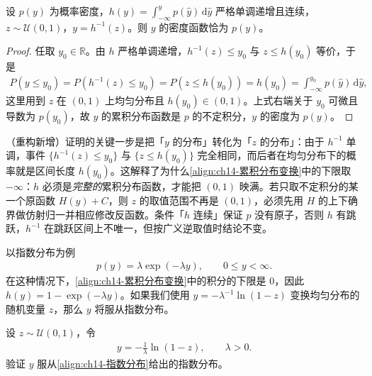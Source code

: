 \documentclass[../../main.tex]{subfiles}
\begin{document}
\begin{proposition}[逆变换采样的正确性]\label{proposition:ch14-逆变换正确性}
设 $p(y)$ 为概率密度，$h(y)=\int_{-\infty}^{y}p(\hat{y})\,\mathrm{d}\hat{y}$ 严格单调递增且连续，$z\sim\mathcal{U}(0,1)$，$y=h^{-1}(z)$。则 $y$ 的密度函数恰为 $p(y)$。
\end{proposition}

\begin{proof}
任取 $y_0\in\mathbb{R}$。由 $h$ 严格单调递增，$h^{-1}(z)\leqslant y_0$ 与 $z\leqslant h(y_0)$ 等价，于是
\begin{align*}
P(y\leqslant y_0)=P\left(h^{-1}(z)\leqslant y_0\right)=P\left(z\leqslant h(y_0)\right)=h(y_0)=\int_{-\infty}^{y_0}p(\hat{y})\,\mathrm{d}\hat{y},
\end{align*}
这里用到 $z$ 在 $(0,1)$ 上均匀分布且 $h(y_0)\in(0,1)$。上式右端关于 $y_0$ 可微且导数为 $p(y_0)$，故 $y$ 的累积分布函数是 $p$ 的不定积分，$y$ 的密度为 $p(y)$。
\end{proof}

\begin{remark}（重构新增）证明的关键一步是把「$y$ 的分布」转化为「$z$ 的分布」：由于 $h^{-1}$ 单调，事件 $\{h^{-1}(z)\leqslant y_0\}$ 与 $\{z\leqslant h(y_0)\}$ 完全相同，而后者在均匀分布下的概率就是区间长度 $h(y_0)$。这解释了为什么\eqref{align:ch14-累积分布变换}中的下限取 $-\infty$：$h$ 必须是\emph{完整的}累积分布函数，才能把 $(0,1)$ 映满。若只取不定积分的某一个原函数 $H(y)+C$，则 $z$ 的取值范围不再是 $(0,1)$，必须先用 $H$ 的上下确界做仿射归一并相应修改反函数。条件「$h$ 连续」保证 $p$ 没有原子，否则 $h$ 有跳跃，$h^{-1}$ 在跳跃区间上不唯一，但按广义逆取值时结论不变。
\end{remark}

以指数分布为例
\begin{align}
p(y)=\lambda\exp(-\lambda y),\qquad 0\leqslant y<\infty.
\label{align:ch14-指数分布}
\end{align}
在这种情况下，\eqref{align:ch14-累积分布变换}中的积分的下限是 $0$，因此 $h(y)=1-\exp(-\lambda y)$。如果我们使用 $y=-\lambda^{-1}\ln(1-z)$ 变换均匀分布的随机变量 $z$，那么 $y$ 将服从指数分布。

\begin{example}[ 指数分布的逆变换采样]\label{example:ch14-指数分布采样}
设 $z\sim\mathcal{U}(0,1)$，令
\begin{align*}
y=-\frac{1}{\lambda}\ln(1-z),\qquad \lambda>0.
\end{align*}
验证 $y$ 服从\eqref{align:ch14-指数分布}给出的指数分布。
\end{example}
\end{document}
